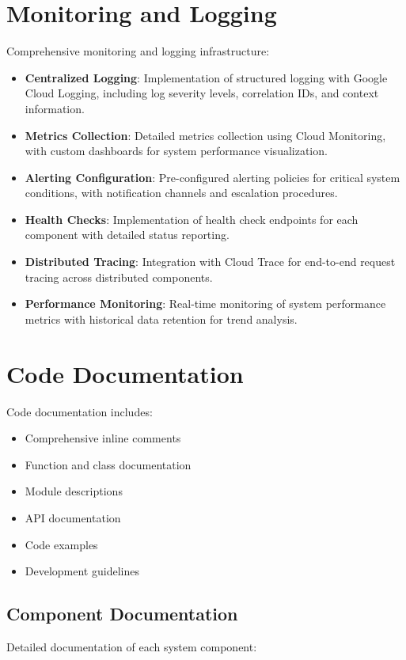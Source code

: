 \documentclass[12pt,a4paper]{report}
\begin{document}
\section{Monitoring and Logging}
Comprehensive monitoring and logging infrastructure:
\begin{itemize}
    \item \textbf{Centralized Logging}: Implementation of structured logging with Google Cloud Logging, including log severity levels, correlation IDs, and context information.
    \item \textbf{Metrics Collection}: Detailed metrics collection using Cloud Monitoring, with custom dashboards for system performance visualization.
    \item \textbf{Alerting Configuration}: Pre-configured alerting policies for critical system conditions, with notification channels and escalation procedures.
    \item \textbf{Health Checks}: Implementation of health check endpoints for each component with detailed status reporting.
    \item \textbf{Distributed Tracing}: Integration with Cloud Trace for end-to-end request tracing across distributed components.
    \item \textbf{Performance Monitoring}: Real-time monitoring of system performance metrics with historical data retention for trend analysis.
\end{itemize}

\section{Code Documentation}
Code documentation includes:
\begin{itemize}
    \item Comprehensive inline comments
    \item Function and class documentation
    \item Module descriptions
    \item API documentation
    \item Code examples
    \item Development guidelines
\end{itemize}

\subsection{Component Documentation}
Detailed documentation of each system component:
\end{document}

